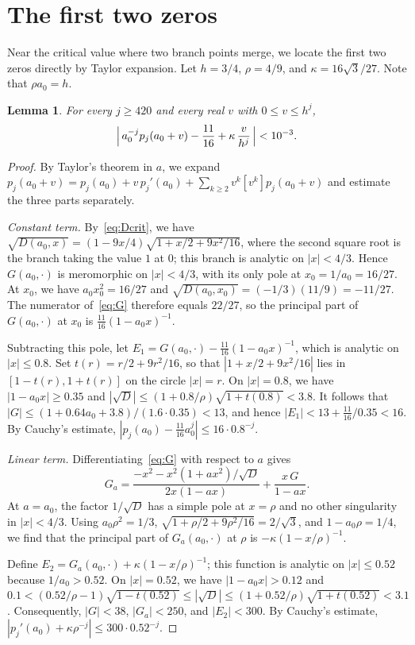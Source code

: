 \documentclass[11pt]{amsart}
\newtheorem{lemma}[theorem]{Lemma}
\theoremstyle{remark}
\begin{document}
\section{The first two zeros}\label{sec:micro}

Near the critical value where two branch points merge, we locate the first
two zeros directly by Taylor expansion. Let $h=3/4$, $\rho=4/9$,
and $\kappa=16\sqrt3/27$. Note that $\rho a_0=h$.

\begin{lemma}\label{lem:micro}
For every $j\ge420$ and every real $v$ with $0\le v\le h^j$,
\[
 \Bigl|\,a_0^{-j}p_j(a_0+v)-\frac{11}{16}+\kappa\,\frac{v}{h^j}\,\Bigr|<10^{-3}.
\]
\end{lemma}

\begin{proof}
By Taylor's theorem in $a$, we expand
$p_j(a_0+v)=p_j(a_0)+v\,p_j'(a_0)+\sum_{k\ge2}v^k[v^k]p_j(a_0+v)$ and
estimate the three parts separately.

\emph{Constant term.} By~\eqref{eq:Dcrit}, we have
$\sqrt{D(a_0,x)}=(1-9x/4)\sqrt{1+x/2+9x^2/16}$, where the second square root
is the branch taking the value $1$ at $0$; this branch is analytic on
$|x|<4/3$. Hence $G(a_0,\cdot)$ is meromorphic on $|x|<4/3$, with its only
pole at $x_0=1/a_0=16/27$. At $x_0$, we have $a_0x_0^2=16/27$ and
$\sqrt{D(a_0,x_0)}=(-1/3)(11/9)=-11/27$. The numerator of~\eqref{eq:G}
therefore equals $22/27$, so the principal part of $G(a_0,\cdot)$ at $x_0$
is $\frac{11}{16}(1-a_0x)^{-1}$.

Subtracting this pole, let $E_1=G(a_0,\cdot)-\frac{11}{16}(1-a_0x)^{-1}$,
which is analytic on $|x|\le0.8$. Set $t(r)=r/2+9r^2/16$, so that
$|1+x/2+9x^2/16|$ lies in $[1-t(r),1+t(r)]$ on the circle $|x|=r$. On
$|x|=0.8$, we have $|1-a_0x|\ge0.35$ and
$|\sqrt{D}|\le(1+0.8/\rho)\sqrt{1+t(0.8)}<3.8$. It follows that
$|G|\le(1+0.64a_0+3.8)/(1.6\cdot0.35)<13$, and hence
$|E_1|<13+\frac{11}{16}/0.35<16$. By Cauchy's estimate,
$|p_j(a_0)-\frac{11}{16}a_0^j|\le16\cdot0.8^{-j}$.

\emph{Linear term.} Differentiating~\eqref{eq:G} with respect to $a$ gives
\[
 G_a=\frac{-x^2-x^2(1+ax^2)/\sqrt D}{2x(1-ax)}+\frac{x\,G}{1-ax}.
\]
At $a=a_0$, the factor $1/\sqrt{D}$ has a simple pole at $x=\rho$ and no
other singularity in $|x|<4/3$. Using $a_0\rho^2=1/3$,
$\sqrt{1+\rho/2+9\rho^2/16}=2/\sqrt3$, and $1-a_0\rho=1/4$, we find that the
principal part of $G_a(a_0,\cdot)$ at $\rho$ is $-\kappa(1-x/\rho)^{-1}$.

Define $E_2=G_a(a_0,\cdot)+\kappa(1-x/\rho)^{-1}$; this function is analytic
on $|x|\le0.52$ because $1/a_0>0.52$. On $|x|=0.52$, we have
$|1-a_0x|>0.12$ and
$0.1<(0.52/\rho-1)\sqrt{1-t(0.52)}\le|\sqrt D|\le(1+0.52/\rho)\sqrt{1+t(0.52)}<3.1$.
Consequently, $|G|<38$, $|G_a|<250$, and $|E_2|<300$. By Cauchy's estimate,
$|p_j'(a_0)+\kappa\rho^{-j}|\le300\cdot0.52^{-j}$.


\end{proof}
\end{document}
